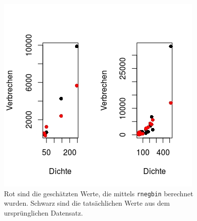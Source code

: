 \begin{figure}
\centering
\includegraphics[scale=1]{./jpgs/dv.jpeg}
\caption[Vergleich Pseudo mit echten Werten]{Rot sind die gesch\"atzten Werte, die mittels \texttt{rnegbin} berechnet wurden. Schwarz sind die tats\"achlichen Werte aus dem urspr\"unglichen Datensatz. }
\label{fig:dv2}
\end{figure} 